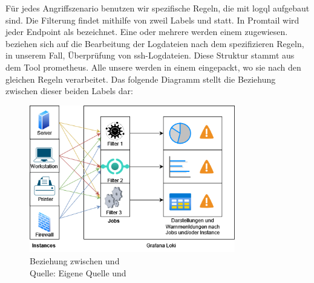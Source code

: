 

Für jedes Angriffszenario benutzen wir spezifische Regeln, die mit \gls{logql} aufgebaut sind. Die Filterung findet mithilfe von zweil Labels  und  statt. In Promtail wird jeder \gls{Endpoint} als  bezeichnet. Eine oder mehrere  werden einem  zugewiesen.  beziehen sich auf die Bearbeitung der Logdateien nach dem spezifizieren Regeln, in unserem Fall, Überprüfung von \gls{ssh}-Logdateien. Diese Struktur stammt aus dem Tool \gls{prometheus}. Alle unsere  werden in einem  eingepackt, wo sie nach den gleichen Regeln verarbeitet. Das folgende Diagramm stellt die Beziehung zwischen dieser beiden Labels dar:

\begin{figure}[H]
   \centering
   \includegraphics[width=0.8\textwidth]{assets/Instance_Jobs.drawio.png}
   \caption[Beziehung zwischen  und ]
   {Beziehung zwischen  und  \\Quelle: Eigene Quelle und \citep{Prometheus_JobInstance}}
   \centering
\end{figure}


